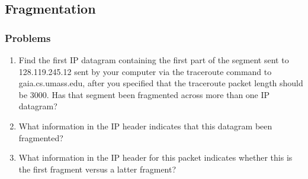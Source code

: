 \subsection{Fragmentation}
    \subsubsection*{Problems}
    \begin{enumerate}[label=\bfseries Problem \arabic*:,leftmargin=*,labelindent=1em]
    \addtocounter{enumi}{8}
        \item Find the first IP datagram containing the first part of the segment sent to 128.119.245.12 sent by your computer via the traceroute command to gaia.cs.umass.edu, after you specified that the traceroute packet length should be 3000. Has that segment been fragmented across more than one IP datagram?\\[0.2mm]
        \soln
        \item What information in the IP header indicates that this datagram been fragmented? \\[0.2mm]
        \soln
        \item What information in the IP header for this packet indicates whether this is the first fragment versus a latter fragment?\\[0.2mm]

\end{enumerate}
